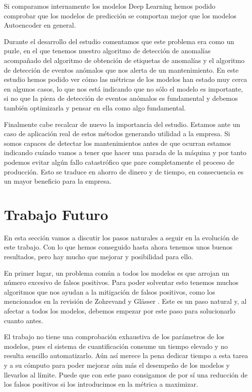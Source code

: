 Si comparamos internamente los modelos Deep Learning hemos podido comprobar que los modelos de predicción se comportan mejor que los modelos Autoencoder en general. 

Durante el desarrollo del estudio comentamos que este problema era como un puzle, en el que tenemos nuestro algoritmo de detección de anomalías acompañado del algoritmo de obtención de etiquetas de anomalías y el algoritmo de detección de eventos anómalos que nos alerta de un mantenimiento. En este estudio hemos podido ver cómo las métricas de los modelos han estado muy cerca en algunos casos, lo que nos está indicando que no sólo el modelo es importante, si no que la pieza de detección de eventos anómalos es fundamental y debemos también optimizarla y pensar en ella como algo fundamental.

Finalmente cabe recalcar de nuevo la importancia del estudio. Estamos ante un caso de aplicación real de estos métodos generando utilidad a la empresa. Si somos capaces de detectar los mantenimientos antes de que ocurran estamos indicando cuándo vamos a tener que hacer una parada de la máquina y por tanto podemos evitar algún fallo catastrófico que pare completamente el proceso de producción. Esto se traduce en ahorro de dinero y de tiempo, en consecuencia es un mayor beneficio para la empresa.

\section{Trabajo Futuro}

En esta sección vamos a discutir los pasos naturales a seguir en la evolución de este trabajo. Con lo que hemos conseguido hasta ahora tenemos unos buenos resultados, pero hay mucho que mejorar y posibilidad para ello.

En primer lugar, un problema común a todos los modelos es que arrojan un número excesivo de falsos positivos. Para poder solventar esto tenemos muchos algoritmos que nos ayudan a la mitigación de falsos positivos, como los mencionados en la revisión de Zohrevand y Glässer \cite{zahra_should_2019}. Este es un paso natural y, al afectar a todos los modelos, debemos empezar por este paso para solucionarlo cuanto antes.

El trabajo no tiene una comprobación exhaustiva de los parámetros de los modelos, pues el sistema de cuantificación consume un tiempo elevado y no resulta sencillo automatizarlo. Aún así merece la pena dedicar tiempo a esta tarea y a su cómputo para poder mejorar aún más el desempeño de los modelos y llevarlos al límite. Puede que con este paso consigamos de por sí una reducción de los falsos positivos si los introducimos en la métrica a maximizar.

